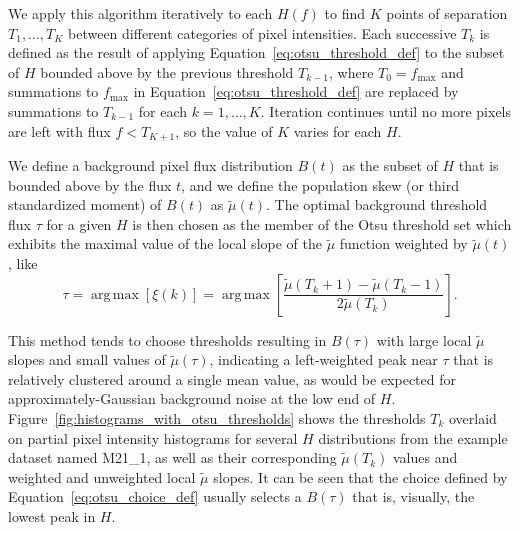 \documentclass[letterpaper,11pt]{article}
\newcommand{\reffig}[1]{Figure~\ref{#1}}
\newcommand{\refeq}[1]{Equation~\ref{#1}}
\DeclareMathOperator*{\argmax}{arg\,max}
\newcommand{\fmax}{f_{\mathrm{max}}}
\begin{document}
We apply this algorithm iteratively to each $H(f)$ to find $K$ points of separation $T_{1}, \ldots, T_{K}$ between different categories of pixel intensities. Each successive $T_{k}$ is defined as the result of applying \refeq{eq:otsu_threshold_def} to the subset of $H$ bounded above by the previous threshold $T_{k-1}$, where $T_{0}=\fmax$ and summations to $\fmax$ in \refeq{eq:otsu_threshold_def} are replaced by summations to $T_{k-1}$ for each $k=1,\ldots,K$. Iteration continues until no more pixels are left with flux $f<T_{K+1}$, so the value of $K$ varies for each $H$.

We define a background pixel flux distribution $B(t)$ as the subset of $H$ that is bounded above by the flux $t$, and we define the population skew (or third standardized moment) of $B(t)$ as $\widetilde{\mu}(t)$. The optimal background threshold flux $\tau$ for a given $H$ is then chosen as the member of the Otsu threshold set which exhibits the maximal value of the local slope of the $\widetilde{\mu}$ function weighted by $\widetilde{\mu}(t)$, like
\begin{equation}
\tau = \argmax{\left[ \xi(k) \right]} = \argmax{ \left[ \frac{ \widetilde{\mu}(T_{k}+1) - \widetilde{\mu}(T_{k}-1) }{ 2 \widetilde{\mu}(T_{k}) } \right] } .
\label{eq:otsu_choice_def}
\end{equation}

This method tends to choose thresholds resulting in $B(\tau)$ with large local $\widetilde{\mu}$ slopes and small values of $\widetilde{\mu}(\tau)$, indicating a left-weighted peak near $\tau$ that is relatively clustered around a single mean value, as would be expected for approximately-Gaussian background noise at the low end of $H$. \reffig{fig:histograms_with_otsu_thresholds} shows the thresholds $T_{k}$ overlaid on partial pixel intensity histograms for several $H$ distributions from the example dataset named M21\_1, as well as their corresponding $\widetilde{\mu}(T_{k})$ values and weighted and unweighted local $\widetilde{\mu}$ slopes. It can be seen that the choice defined by \refeq{eq:otsu_choice_def} usually selects a $B(\tau)$ that is, visually, the lowest peak in $H$.
\end{document}
